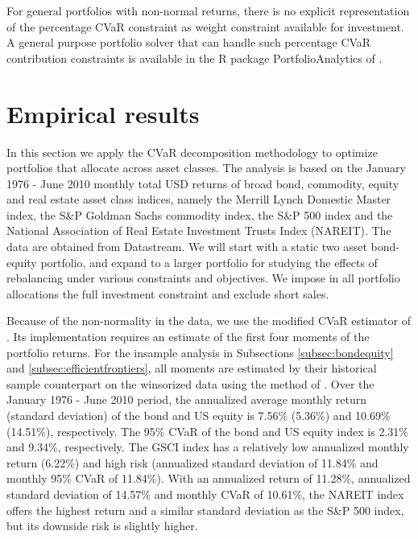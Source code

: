 \documentclass[12pt,a4paper]{article}
\begin{document}
For general portfolios with non-normal returns, there is no explicit representation of the percentage CVaR constraint as weight constraint available for investment. A general purpose portfolio solver that can handle such percentage CVaR contribution constraints is available in the R package PortfolioAnalytics of \citet{PortfolioAnalytics}.

\section{Empirical results \label{sec:empiricalresults}}


In this section we apply the CVaR decomposition methodology to optimize portfolios that allocate across asset classes. The analysis is based on the January 1976 - June 2010 monthly total USD returns of broad bond, commodity, equity and real estate asset class indices, namely the Merrill Lynch Domestic Master index,  the S\&P Goldman Sachs commodity index, the S\&P 500 index and the National Association of Real Estate Investment Trusts Index (NAREIT). The data are obtained from Datastream.  We will start with a static two asset bond-equity portfolio, and expand to a larger portfolio for studying the effects of rebalancing under various constraints and objectives. We impose in all portfolio allocations the full investment constraint and exclude short sales.

Because of the non-normality in the data, we use the modified CVaR estimator of \citet{Boudt2007}. Its implementation requires an estimate of the first four moments of the portfolio returns. For the insample analysis in Subsections \ref{subsec:bondequity} and \ref{subsec:efficientfrontiers}, all moments are estimated by their historical sample counterpart on the winsorized data using the method of \citet{Boudt2007}. Over the January 1976 - June 2010 period, the annualized average monthly return (standard deviation) of the bond and US equity is 7.56\% (5.36\%) and 10.69\% (14.51\%), respectively. The 95\% CVaR of the bond and US equity index is 2.31\% and 9.34\%, respectively. The GSCI index has a relatively low annualized monthly return (6.22\%) and high risk (annualized standard deviation of 11.84\% and monthly 95\% CVaR of 11.84\%). With an annualized return of 11.28\%, annualized standard deviation of 14.57\% and monthly CVaR of 10.61\%, the NAREIT index offers the highest return and a similar standard deviation as the S\&P 500 index, but its downside risk is slightly higher.
\end{document}

